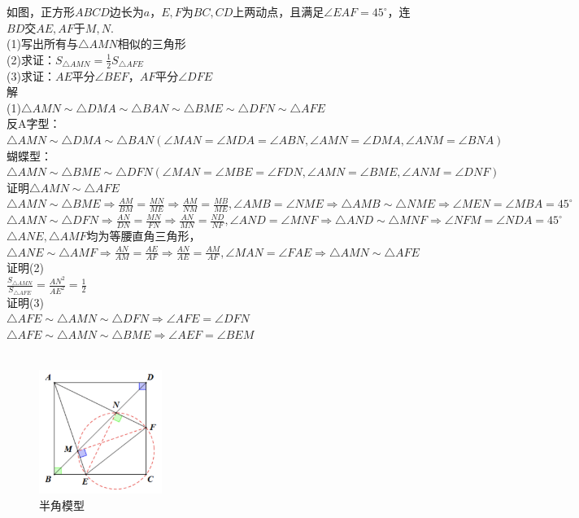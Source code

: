\documentclass{ecnuthesis}
\begin{document}
\begin{example}
    如图，正方形$ABCD$边长为$a$，$E,F$为$BC,CD$上两动点，且满足$\angle EAF=45^\circ$，连$BD$交$AE,AF$于$M,N$. \\
    (1)写出所有与$\triangle AMN$相似的三角形 \\
    (2)求证：$S_{\triangle AMN}=\frac{1}{2}S_{\triangle AFE}$ \\
    (3)求证：$AE$平分$\angle BEF$，$AF$平分$\angle DFE$\\
    解 \\
    (1)$\triangle AMN \sim \triangle DMA \sim \triangle BAN \sim \triangle BME \sim \triangle DFN \sim \triangle AFE$ \\
    反A字型：$\triangle AMN \sim \triangle DMA \sim \triangle BAN(\angle MAN=\angle MDA=\angle ABN,\angle AMN=\angle DMA,\angle ANM=\angle BNA)$ \\
    蝴蝶型：$\triangle AMN \sim \triangle BME \sim \triangle DFN(\angle MAN=\angle MBE=\angle FDN,\angle AMN=\angle BME,\angle ANM=\angle DNF)$ \\
    证明$\triangle AMN \sim \triangle AFE$ \\
    $\triangle AMN\sim\triangle BME\Rightarrow\frac{AM}{BM}=\frac{MN}{ME}\Rightarrow\frac{AM}{NM}=\frac{MB}{ME},\angle AMB=\angle NME\Rightarrow\triangle AMB\sim\triangle NME\Rightarrow\angle MEN=\angle MBA=45^\circ$ \\
    $\triangle AMN\sim\triangle DFN\Rightarrow\frac{AN}{DN}=\frac{MN}{FN}\Rightarrow\frac{AN}{MN}=\frac{ND}{NF},\angle AND=\angle MNF\Rightarrow\triangle AND\sim\triangle MNF\Rightarrow\angle NFM=\angle NDA=45^\circ$ \\
    $\triangle ANE,\triangle AMF$均为等腰直角三角形，$\triangle ANE \sim \triangle AMF \Rightarrow \frac{AN}{AM}=\frac{AE}{AF} \Rightarrow \frac{AN}{AE}=\frac{AM}{AF},\angle MAN=\angle FAE\Rightarrow \triangle AMN \sim \triangle AFE$ \\
    证明(2) \\
    $\frac{S_{\triangle AMN}}{S_{\triangle AFE}}=\frac{AN^2}{AE^2}=\frac{1}{2}$ \\
    证明(3) \\
    $\triangle AFE \sim \triangle AMN \sim \triangle DFN \Rightarrow \angle AFE=\angle DFN$ \\
    $\triangle AFE \sim \triangle AMN \sim \triangle BME \Rightarrow \angle AEF=\angle BEM$ \\
    \\
\end{example}
\begin{figure}[H]
\centering
\includegraphics[width=4cm]{picture/6104.png}
\caption{半角模型}
\end{figure}
\end{document}
